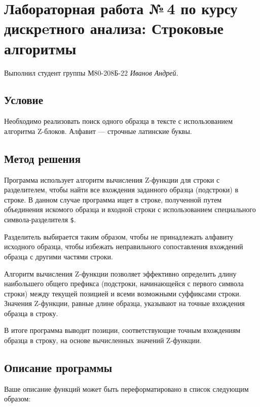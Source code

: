 \documentclass[12pt]{article}
\begin{document}
\section*{Лабораторная работа №\,4 по курсу дискрeтного анализа: Строковые алгоритмы}
Выполнил студент группы М80-208Б-22 \textit{Иванов Андрей}.

\subsection*{Условие}

Необходимо реализовать поиск одного образца в тексте с использованием алгоритма Z-блоков. Алфавит — строчные латинские буквы. 

\subsection*{Метод решения}

Программа использует алгоритм вычисления Z-функции для строки с разделителем, чтобы найти все вхождения заданного образца (подстроки) в строке. В данном случае программа ищет в строке, полученной путем объединения искомого образца и входной строки с использованием специального символа-разделителя \texttt{\$}.

Разделитель выбирается таким образом, чтобы не принадлежать алфавиту исходного образца, чтобы избежать неправильного сопоставления вхождений образца с другими частями строки.

Алгоритм вычисления Z-функции позволяет эффективно определить длину наибольшего общего префикса (подстроки, начинающейся с первого символа строки) между текущей позицией и всеми возможными суффиксами строки. Значения Z-функции, равные длине образца, указывают на точные вхождения образца в строку.

В итоге программа выводит позиции, соответствующие точным вхождениям образца в строку, на основе вычисленных значений Z-функции.

\subsection*{Описание программы}

Ваше описание функций может быть переформатировано в список следующим образом:
\end{document}
